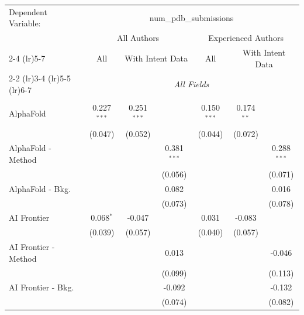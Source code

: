\begingroup
\centering
\begin{tabular}{lcccccc}
   \tabularnewline \midrule \midrule
   Dependent Variable: & \multicolumn{6}{c}{num\_pdb\_submissions}\\
 & \multicolumn{3}{c}{All Authors} & \multicolumn{3}{c}{Experienced Authors} \\
\cmidrule(lr){2-4} \cmidrule(lr){5-7}
 & \multicolumn{1}{c}{All} & \multicolumn{2}{c}{With Intent Data} & \multicolumn{1}{c}{All} & \multicolumn{2}{c}{With Intent Data} \\
\cmidrule(lr){2-2} \cmidrule(lr){3-4} \cmidrule(lr){5-5} \cmidrule(lr){6-7}
 & \multicolumn{6}{c}{\textit{All Fields}} \\ \\
   AlphaFold            & 0.227$^{***}$  & 0.251$^{***}$  &                & 0.150$^{***}$  & 0.174$^{**}$   &   \\   
                        & (0.047)        & (0.052)        &                & (0.044)        & (0.072)        &   \\   
   AlphaFold - Method   &                &                & 0.381$^{***}$  &                &                & 0.288$^{***}$\\   
                        &                &                & (0.056)        &                &                & (0.071)\\   
   AlphaFold - Bkg.     &                &                & 0.082          &                &                & 0.016\\   
                        &                &                & (0.073)        &                &                & (0.078)\\   
   AI Frontier          & 0.068$^{*}$    & -0.047         &                & 0.031          & -0.083         &   \\   
                        & (0.039)        & (0.057)        &                & (0.040)        & (0.057)        &   \\   
   AI Frontier - Method &                &                & 0.013          &                &                & -0.046\\   
                        &                &                & (0.099)        &                &                & (0.113)\\   
   AI Frontier - Bkg.   &                &                & -0.092         &                &                & -0.132\\   
                        &                &                & (0.074)        &                &                & (0.082)\\   

\end{tabular}
